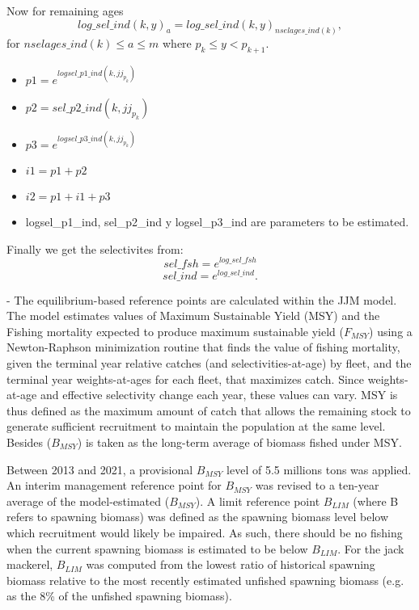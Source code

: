 \documentclass{article}
\begin{document}
\begin{itemize}
    Now for remaining ages
    \begin{equation}
         log\_sel\_ind(k,y)_a = log\_sel\_ind(k,y)_{nselages\_ind(k)},
    \end{equation}
    for $nselages\_ind(k)\leq a \leq m$ where $p_k\leq y < p_{k+1}$.
\begin{itemize}
    \item $p1 = e^{logsel\_p1\_ind(k,jj_{p_k})}$
    \item $p2 = sel\_p2\_ind(k,jj_{p_k})$
    \item $p3 = e^{logsel\_p3\_ind(k,jj_{p_k})}$
    \item $i1 = p1 + p2$
    \item $i2 = p1 + i1 + p3$
    \item logsel\_p1\_ind, sel\_p2\_ind y logsel\_p3\_ind are parameters to be estimated.
\end{itemize}

    
\end{itemize}
Finally we get the selectivites from:
\begin{equation}
    sel\_fsh=e^{log\_sel\_fsh}
\end{equation}
\begin{equation}
    sel\_ind=e^{log\_sel\_ind}.
\end{equation}

- The equilibrium-based reference points are calculated within the JJM model. The model estimates values of Maximum Sustainable Yield (MSY) and the Fishing mortality expected to produce maximum sustainable yield (\(F_{MSY}\)) using a Newton-Raphson minimization routine that finds the value of fishing mortality, given the terminal year relative catches (and selectivities-at-age) by fleet,  and the terminal year weights-at-ages for each fleet, that maximizes catch. Since weights-at-age and effective selectivity change each year, these values can vary. MSY is thus defined as the maximum amount of catch that allows the remaining stock to generate sufficient recruitment to maintain the population at the same level. Besides (\(B_{MSY}\)) is taken as the long-term average of biomass fished under MSY.

Between 2013 and 2021, a provisional \(B_{MSY}\) level of 5.5 millions tons was applied. 
An interim management reference point for \(B_{MSY}\) was revised to a ten-year average of the model-estimated (\(B_{MSY}\)). 
A limit reference point \(B_{LIM}\) (where B refers to spawning biomass) was defined as the spawning biomass level below which recruitment would likely be impaired. As such, there should be no fishing when the current spawning biomass is estimated to be below \(B_{LIM}\).
For the jack mackerel, \(B_{LIM}\) was computed from the lowest ratio of historical spawning biomass relative to the most recently estimated unfished spawning biomass (e.g. as the 8\% of the unfished spawning biomass).\\
\end{document}
